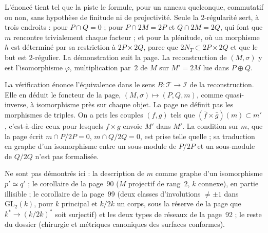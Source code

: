 \begin{remarque}
L'énoncé tient tel que la piste le formule, pour un anneau quelconque, commutatif ou non, sans hypothèse de finitude ni de projectivité. Seule la $2$-régularité sert, à trois endroits : pour $P \cap Q = 0$ ; pour $P \cap 2M = 2P$ et $Q \cap 2M = 2Q$, qui font que $m$ rencontre trivialement chaque facteur ; et pour la plénitude, où un morphisme $h$ est déterminé par sa restriction à $2P \times 2Q$, parce que $2N_T \subset 2P \times 2Q$ et que le but est $2$-régulier. La démonstration suit la page. La reconstruction de $(M, \sigma)$ y est l'isomorphisme $\varphi$, multiplication par~$2$ de $M$ sur $M' = 2M$ lue dans $P \oplus Q$.
\end{remarque}

\begin{remarque}
La vérification énonce l'équivalence dans le sens $B : \mathcal T \to \mathcal I$ de la reconstruction. Elle en déduit le foncteur de la page, $(M, \sigma) \mapsto (P, Q, m)$, comme quasi-inverse, à isomorphisme près sur chaque objet. La page ne définit pas les morphismes de triples. On a pris les couples $(f, g)$ tels que $(\bar f \times \bar g)(m) \subset m'$, c'est-à-dire ceux pour lesquels $f \times g$ envoie $M'$ dans $M'$. La condition sur $m$, que la page écrit $m \cap P/2P = 0$, $m \cap Q/2Q = 0$, est prise telle quelle ; sa traduction en graphe d'un isomorphisme entre un sous-module de $P/2P$ et un sous-module de $Q/2Q$ n'est pas formalisée.
\end{remarque}

Ne sont pas démontrés ici : la description de $m$ comme graphe d'un isomorphisme $p' \simeq q'$ ; le corollaire de la page~90 ($M$ projectif de rang~$2$, $k$ connexe), en partie illisible ; le corollaire de la page~99 (deux classes d'involutions $\neq \pm 1$ dans $\mathrm{GL}_2(k)$, pour $k$ principal et $k/2k$ un corps, sous la réserve de la page que $k^* \to (k/2k)^*$ soit surjectif) et les deux types de réseaux de la page~92 ; le reste du dossier (chirurgie et métriques canoniques des surfaces conformes).
